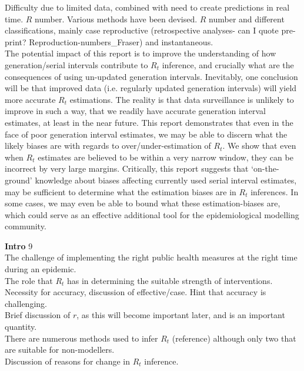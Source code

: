 \documentclass[10pt,journal,compsoc]{IEEEtran}
\begin{document}
Difficulty due to limited data, combined with need to create predictions in real time. $R$ number. Various methods have been devised. $R$ number and different classifications, mainly case reproductive (retrospective analyses- can I quote pre-print? Reproduction-numbers\_Fraser) and instantaneous.\\

The potential impact of this report is to improve the understanding of how generation/serial intervals contribute to $R_t$ inference, and crucially what are the consequences of using un-updated generation intervals. Inevitably, one conclusion will be that improved data (i.e. regularly updated generation intervals) will yield more accurate $R_t$ estimations. The reality is that data surveillance is unlikely to improve in such a way, that we readily have accurate generation interval estimates, at least in the near future. This report demonstrates that even in the face of poor generation interval estimates, we may be able to discern what the likely biases are with regards to over/under-estimation of $R_t$. We show that even when $R_t$ estimates are believed to be within a very narrow window, they can be incorrect by very large margins.
Critically, this report suggests that `on-the-ground' knowledge about biases affecting currently used serial interval estimates, may be sufficient to determine what the estimation biases are in $R_t$ inferences.
In some cases, we may even be able to bound what these estimation-biases are, which could serve as an effective additional tool for the epidemiological modelling community.

\textbf{Intro} 9 \\ 

The challenge of implementing the right public health measures at the right time during an epidemic.\\

The role that $R_t$ has in determining the suitable strength of interventions. Necessity for accuracy, discussion of effective/case. Hint that accuracy is challenging.\\

Brief discussion of $r$, as this will become important later, and is an important quantity.\\

There are numerous methods used to infer $R_t$ (reference) although only two that are suitable for non-modellers.\\

Discussion of reasons for change in $R_t$ inference.\\
\end{document}
